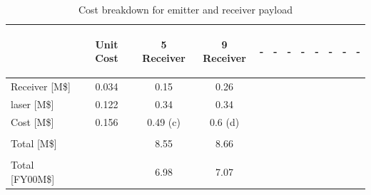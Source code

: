 \begin{table}[ht!]
\begin{tabular}{p{0.9in}|cccccccccc||c}
&\begin{sideways}Unit Cost\end{sideways} 
&\begin{sideways}5 Receiver\end{sideways} 
&\begin{sideways}9 Receiver\end{sideways} 
&\begin{sideways}-\end{sideways} 
&\begin{sideways}-\end{sideways}
&\begin{sideways}-\end{sideways} 
&\begin{sideways}-\end{sideways} 
&\begin{sideways}-\end{sideways} 
&\begin{sideways}-\end{sideways} 
&\begin{sideways}-\end{sideways}
&\begin{sideways}-\end{sideways}\\\hline
Receiver [M\$] &0.034 &0.15 &0.26 & & & & & & & & \\
\acs{laser} [M\$] &0.122 &0.34 &0.34 & & & & & & & & \\\hline\hline
Cost [M\$] &0.156 &0.49 (c) &0.6 (d) & & & & & & & &\\\hline\hline\\
Total [M\$] & &8.55 &8.66 & & & & & & & &\\\hline\\
Total [FY00M\$] & &6.98 &7.07 & & & & & & & &\\
\end{tabular}
\caption{Cost breakdown for emitter and receiver payload}
\label{tab:cost_payload}
\end{table}